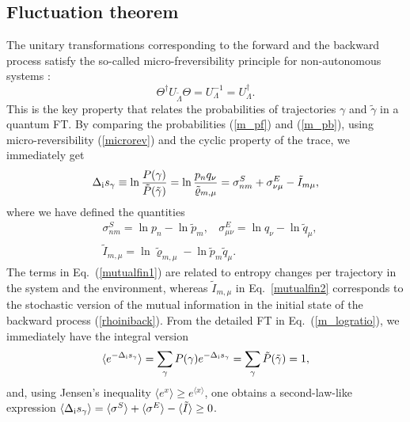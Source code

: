 \documentclass[aps,prx,twocolumn,showpacs,floatfix,superscriptaddress,graphics,longbibliography]{revtex4-1}
\newcommand{\HAT}{}
\begin{document}
\subsection{Fluctuation theorem}


The unitary transformations corresponding to the forward and the backward process satisfy the so-called micro-freversibility principle for non-autonomous systems
\cite{Andrieux-Gaspard, CampisiREV}:
\begin{equation}\label{microrev}
\HAT\Theta^\dagger \HAT{U}_{\tilde{\Lambda}} \HAT\Theta= \HAT{U}_{\Lambda}^{-1}= \HAT{U}_{\Lambda}^\dagger.
\end{equation} 
This is the key property that relates the probabilities of trajectories $\gamma$ and $\tilde{\gamma}$ in a quantum FT. By comparing the probabilities (\ref{m_pf}) and (\ref{m_pb}), using micro-reversibility (\ref{microrev}) and the 
cyclic property of the trace, we immediately get
\begin{equation}\label{m_logratio}
\Delta_{\rm i} s_\gamma \equiv \ln \frac{P({\gamma})}{\tilde{P}({\tilde{\gamma})}} =\ln \frac{{p}_n {q}_\nu}{\tilde\varrho_{m, \mu}}=\sigma^S_{n m} + \sigma^E_{\nu \mu} - \tilde{I}_{m \mu},
\end{equation}
where we have defined the quantities
\begin{align} \label{mutualfin1} 
 & \sigma^S_{n m} = \ln p_n - \ln \tilde{p}_m, ~~~~ \sigma_{\mu \nu}^E = \ln q_\nu - \ln \tilde{q}_\mu, \\ \label{mutualfin2}
 & \tilde{I}_{m, \mu} = \ln{\tilde\varrho_{m, \mu}} - \ln{\tilde{p}_m \tilde{q}_\mu}.  
 \end{align}
The terms in Eq.~(\ref{mutualfin1}) are related to entropy changes per trajectory in the system and the environment, whereas $\tilde{I}_{m, \mu}$ in Eq.~\eqref{mutualfin2} corresponds to the stochastic version of the mutual information \cite{StochasticMutual, Vedral} in the initial state of the backward process (\ref{rhoiniback}).
From the detailed FT in Eq.~(\ref{m_logratio}), we immediately have the integral version
\begin{equation}\label{inttotalFT}
 \langle e^{- \Delta_{\rm i} s_\gamma} \rangle = \sum_{\gamma} P(\gamma) e^{- \Delta_{\rm i} s_\gamma} = \sum_{\gamma}  \tilde{P}({\tilde{\gamma}}) = 1,
\end{equation}
and, using Jensen's inequality $\langle e^x \rangle \geq e^{\langle x \rangle}$, one obtains a second-law-like expression
$\langle  \Delta_{\rm i} s_\gamma \rangle = \langle \sigma^S \rangle + \langle \sigma^E \rangle - \langle \tilde{I} \rangle \geq 0$.
\end{document}
